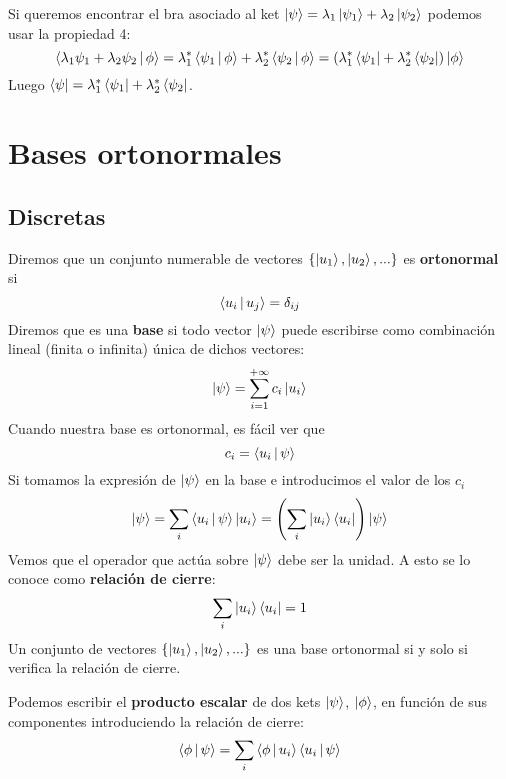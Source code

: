 \documentclass[12pt]{report}
\begin{document}
Si queremos encontrar el bra asociado al ket $\ket{\psi }=\lambda_{1}\ket{\psi_{1}}+\lambda_{2}\ket{\psi_{2}}$ podemos usar la propiedad 4:
\[ \Braket{\lambda_{1}\psi_{1}+\lambda_{2}\psi_{2} |\phi }=\lambda_{1}^{\ast}\Braket{\psi_{1} |\phi }+\lambda_{2}^{\ast}\Braket{\psi_{2} |\phi}=\left(\lambda_{1}^{\ast}\bra{\psi_{1}}+\lambda_{2}^{\ast }\bra{\psi_{2}}\right)\ket{\phi}\]
Luego $\bra{\psi }=\lambda_{1}^{\ast}\bra{\psi_{1}}+\lambda_{2}^{\ast }\bra{\psi_{2}}$.



\section{Bases ortonormales}
\subsection{Discretas}
Diremos que un conjunto numerable de vectores $\left\{ \ket{u_{1}},\ket{u_{2}},...\right\}$ es \textbf{ortonormal} si
\begin{equation}
	\Braket{u_{i}|u_{j}}=\delta_{ij}
\end{equation}
Diremos que es una \textbf{base} si todo vector $\ket{\psi }$ puede escribirse como combinación lineal (finita o infinita) única de dichos vectores:
\begin{equation}
	\ket{\psi }=\sum_{i=1}^{+\infty}c_{i}\ket{u_{i}}
\end{equation}
Cuando nuestra base es ortonormal, es fácil ver que
\begin{equation}
	c_{i}=\Braket{u_{i}|\psi}
\end{equation}
Si tomamos la expresión de $\ket{\psi }$ en la base e introducimos el valor de los $c_{i}$ 
\[ \ket{\psi }=\sum_{i}\Braket{u_{i}|\psi }\ket{u_{i}}=\left( \sum_{i}\ket{u_{i}}\bra{u_{i}}\right)\ket{\psi} \]
Vemos que el operador que actúa sobre $\ket{\psi }$ debe ser la unidad. A esto se lo conoce como \textbf{relación de cierre}:
\begin{equation}
	\sum_{i}\ket{u_{i}}\bra{u_{i}}=1
\end{equation}
Un conjunto de vectores $\left\{ \ket{u_{1}},\ket{u_{2}},...\right\}$ es una base ortonormal si y solo si verifica la relación de cierre.

Podemos escribir el \textbf{producto escalar} de dos kets $\ket{\psi }$, $\ket{\phi }$, en función de sus componentes introduciendo la relación de cierre:
\begin{equation}
	\Braket{\phi |\psi }=\sum_{i}\Braket{\phi |u_{i}}\Braket{u_{i}|\psi}
\end{equation}
\end{document}
